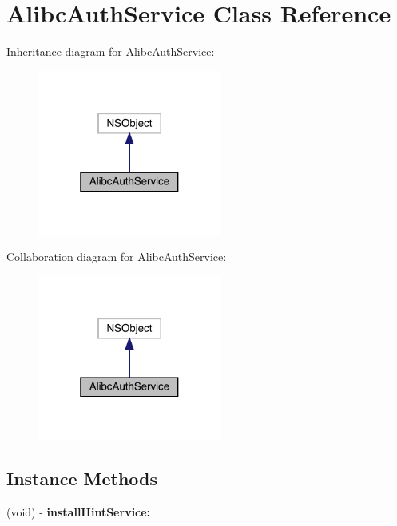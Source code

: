 \hypertarget{interface_alibc_auth_service}{}\section{Alibc\+Auth\+Service Class Reference}
\label{interface_alibc_auth_service}


Inheritance diagram for Alibc\+Auth\+Service\+:\nopagebreak
\begin{figure}[H]
\begin{center}
\leavevmode
\includegraphics[width=172pt]{interface_alibc_auth_service__inherit__graph}
\end{center}
\end{figure}


Collaboration diagram for Alibc\+Auth\+Service\+:\nopagebreak
\begin{figure}[H]
\begin{center}
\leavevmode
\includegraphics[width=172pt]{interface_alibc_auth_service__coll__graph}
\end{center}
\end{figure}
\subsection*{Instance Methods}
\begin{DoxyCompactItemize}
\item 
\mbox{\label{interface_alibc_auth_service_a7d731c2041ef72b6c0c2f6bf0dab9a32}} 
(void) -\/ {\bfseries install\+Hint\+Service\+:}
\end{DoxyCompactItemize}
